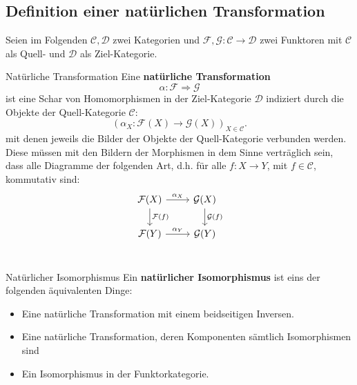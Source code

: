 \documentclass[a4paper]{amsart}
\theoremstyle{definition}
\begin{document}
\subsection{Definition einer natürlichen Transformation}
Seien im Folgenden $\mathcal{C,D}$ zwei Kategorien und $\mathcal F,\mathcal G \colon \mathcal C \to \mathcal D$ zwei Funktoren mit $\mathcal C$ als Quell- und $\mathcal D$ als Ziel-Kategorie.

\begin{Definition}{Natürliche Transformation}
   Eine \textbf{natürliche Transformation} 
   \begin{equation}
      \alpha \colon \mathcal F \Rightarrow \mathcal G
   \end{equation}
   ist eine Schar von Homomorphismen in der Ziel-Kategorie $\mathcal{D}$ indiziert durch die Objekte der Quell-Kategorie $\mathcal C$:
   \begin{equation}
      \left (\alpha_X \colon \mathcal F(X) \to \mathcal G(X) \right )_{X \in \mathcal C}.
   \end{equation}
   mit denen jeweils die Bilder der Objekte der Quell-Kategorie verbunden werden. Diese müssen mit den Bildern der Morphismen in dem Sinne verträglich sein, dass alle Diagramme der folgenden Art, d.h. für alle $f \colon X \to Y$, mit $f \in \mathcal C$, kommutativ sind:
   \begin{equation}\label{kommutativ}
      \begin{tikzcd}
         \mathcal F(X) \arrow[r, "\alpha_X"] \arrow[d, "\mathcal F(f)"]
         & \mathcal  G(X) \arrow[d, "\mathcal G(f)"]\\
         \mathcal F(Y) \arrow[r, "\alpha_Y"]  
         & \mathcal  G(Y)\\
      \end{tikzcd}
   \end{equation}
\end{Definition}

\begin{Definition}{Natürlicher Isomorphismus}
   Ein \textbf{natürlicher Isomorphismus} ist eins der folgenden äquivalenten Dinge:
   \begin{itemize}
      \item Eine natürliche Transformation mit einem beidseitigen Inversen.
      \item Eine natürliche Transformation, deren Komponenten sämtlich Isomorphismen sind
      \item Ein Isomorphismus in der Funktorkategorie.
   \end{itemize}
\end{Definition}
\end{document}
